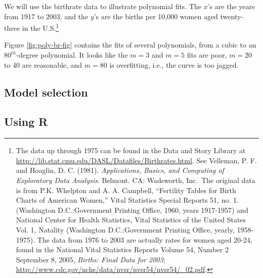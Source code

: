 \documentclass[
]{book}
\begin{document}
We will use the birthrate data to illustrate polynomial fits. The \(x\)'s are the years from 1917 to 2003, and the
\(y\)'s are the births per 10,000 women aged twenty-three in the
U.S.\footnote{The data up through 1975 can be found in the Data and Story Library at
  \url{http://lib.stat.cmu.edu/DASL/Datafiles/Birthrates.html}. See
  Velleman, P. F. and Hoaglin, D. C. (1981). \emph{Applications, Basics, and Computing of
  Exploratory Data Analysis}. Belmont. CA: Wadsworth, Inc.~The original data is from
  P.K. Whelpton and A. A. Campbell, ``Fertility Tables for Birth Charts of American Women,'' Vital Statistics Special Reports 51, no. 1.
  (Washington D.C.:Government Printing Office, 1960, years 1917-1957)
  and National Center for Health Statistics, Vital Statistics of the United States Vol. 1, Natality (Washington D.C.:Government Printing Office, yearly, 1958-1975).
  The data from 1976 to 2003 are actually rates for women
  aged 20-24, found in
  the National Vital Statistics Reports
  Volume 54, Number 2 September 8, 2005, \emph{Births: Final Data for 2003};
  \url{http://www.cdc.gov/nchs/data/nvsr/nvsr54/nvsr54/_02.pdf}.}

Figure \ref{fig:poly-br-fig} contains the fits of several polynomials, from a cubic to an \(80^{th}\)-degree polynomial.
It looks like the \(m=3\) and \(m=5\) fits are poor, \(m=20\) to 40 are reasonable, and \(m=80\) is overfitting, i.e., the
curve is too jagged.

\hypertarget{model-selection}{%
\subsection{Model selection}\label{model-selection}}

\hypertarget{using-r-1}{%
\subsection{Using R}\label{using-r-1}}
\end{document}
